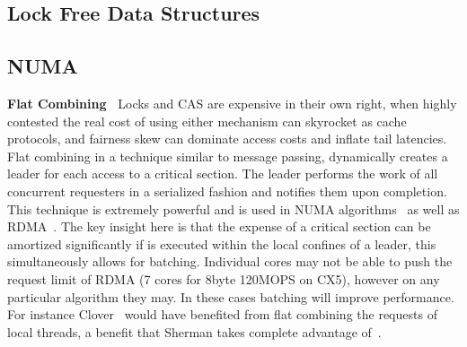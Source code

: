 

\subsection{Lock Free Data Structures}


\subsection{NUMA}

\textbf{Flat Combining~\cite{flat-combine}} Locks and CAS are expensive in their
own right, when highly contested the real cost of using either mechanism can
skyrocket as cache protocols, and fairness skew can dominate access costs and
inflate tail latencies. Flat combining in a technique similar to message
passing, dynamically creates a leader for each access to a critical section. The
leader performs the work of all concurrent requesters in a serialized fashion
and notifies them upon completion. This technique is extremely powerful and is
used in NUMA algorithms~\cite{black-box-numa} as well as RDMA~\cite{flock}. The
key insight here is that the expense of a critical section can be amortized
significantly if is executed within the local confines of a leader, this
simultaneously allows for batching. Individual cores may not be able to push the
request limit of RDMA (7 cores for 8byte 120MOPS on CX5), however on
any particular algorithm they may. In these cases batching will improve
performance. For instance Clover~\cite{clover} would have benefited from flat
combining the requests of local threads, a benefit that Sherman takes complete
advantage of~\cite{sherman}.


